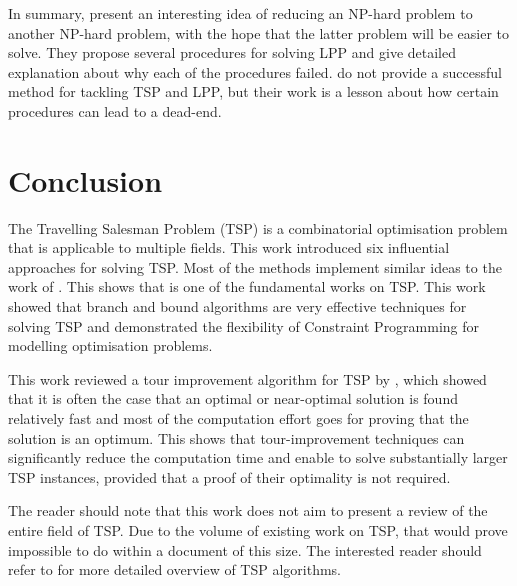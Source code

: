 \documentclass[a4paper,12pt]{article}
\begin{document}
In summary, \citet{Hardgrave62} present an interesting idea of reducing an NP-hard problem to another NP-hard problem, with the hope that the latter problem will be easier to solve. They propose several procedures for solving LPP and give detailed explanation about why each of the procedures failed. \citet{Hardgrave62} do not provide a successful method for tackling TSP and LPP, but their work is a lesson about how certain procedures can lead to a dead-end.

\section{Conclusion}
The Travelling Salesman Problem (TSP) is a combinatorial optimisation problem that is applicable to multiple fields. This work introduced six influential approaches for solving TSP. Most of the methods implement similar ideas to the work of \citet{Dantzig54} \citep{Caseau97,HeldK71,Little63}. This shows that \citet{Dantzig54} is one of the fundamental works on TSP. This work showed that branch and bound algorithms are very effective techniques for solving TSP and demonstrated the flexibility of Constraint Programming for modelling optimisation problems.

This work reviewed a tour improvement algorithm for TSP by \citet{LinKernighan73}, which showed that it is often the case that an optimal or near-optimal solution is found relatively fast and most of the computation effort goes for proving that the solution is an optimum. This shows that tour-improvement techniques can significantly reduce the computation time and enable to solve substantially larger TSP instances, provided that a proof of their optimality is not required.

The reader should note that this work does not aim to present a review of the entire field of TSP. Due to the volume of existing work on TSP, that would prove impossible to do within a document of this size. The interested reader should refer to \citet{Applegate07,tspbible} for more detailed overview of TSP algorithms.

\newpage

 

\end{document}
